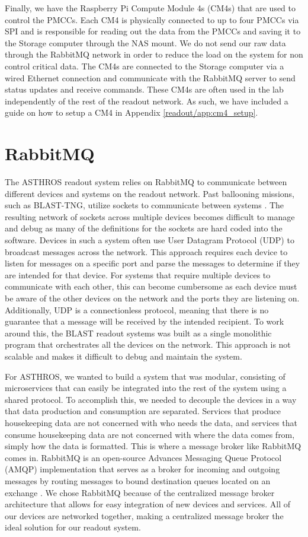 Finally, we have the Raspberry Pi Compute Module 4s (CM4s) that are used to control the PMCCs. 
Each CM4 is physically connected to up to four PMCCs via SPI and is responsible for reading out the data from the PMCCs and saving it to the Storage computer through the NAS mount.
We do not send our raw data through the RabbitMQ network in order to reduce the load on the system for non control critical data. 
The CM4s are connected to the Storage computer via a wired Ethernet connection and communicate with the RabbitMQ server to send status updates and receive commands.
These CM4s are often used in the lab independently of the rest of the readout network.
As such, we have included a guide on how to setup a CM4 in Appendix \ref{readout/app:cm4_setup}.

\section{RabbitMQ}
\label{readout/section:rmqtools}
The ASTHROS readout system relies on RabbitMQ to communicate between different devices and systems on the readout network.
Past ballooning missions, such as BLAST-TNG, utilize sockets to communicate between systems \parencite{gordon2019highly}.
The resulting network of sockets across multiple devices becomes difficult to manage and debug as many of the definitions for the sockets are hard coded into the software.
Devices in such a system often use User Datagram Protocol (UDP) to broadcast messages across the network.
This approach requires each device to listen for messages on a specific port and parse the messages to determine if they are intended for that device.
For systems that require multiple devices to communicate with each other, this can become cumbersome as each device must be aware of the other devices on the network and the ports they are listening on.
Additionally, UDP is a connectionless protocol, meaning that there is no guarantee that a message will be received by the intended recipient.
To work around this, the BLAST readout systems was built as a single monolithic program that orchestrates all the devices on the network.
This approach is not scalable and makes it difficult to debug and maintain the system.

For ASTHROS, we wanted to build a system that was modular, consisting of microservices that can easily be integrated into the rest of the system using a shared protocol.
To accomplish this, we needed to decouple the devices in a way that data production and consumption are separated.
Services that produce housekeeping data are not concerned with who needs the data, and services that consume housekeeping data are not concerned with where the data comes from, simply how the data is formatted. 
This is where a message broker like RabbitMQ comes in.
RabbitMQ is an open-source Advances Messaging Queue Protocol (AMQP) implementation that serves as a broker for incoming and outgoing messages by routing messages to bound destination queues located on an exchange \parencite{dunne2018comparison}.
We chose RabbitMQ because of the centralized message broker architecture that allows for easy integration of new devices and services.
All of our devices are networked together, making a centralized message broker the ideal solution for our readout system.

